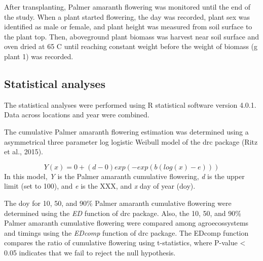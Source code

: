 \documentclass[utf8]{frontiersSCNS}
\begin{document}
After transplanting, Palmer amaranth flowering was monitored until the
end of the study. When a plant started flowering, the day was recorded,
plant sex was identified as male or female, and plant height was
measured from soil surface to the plant top. Then, aboveground plant
biomass was harvest near soil surface and oven dried at 65 C until
reaching constant weight before the weight of biomass (g plant 1) was
recorded.

\hypertarget{statistical-analyses}{%
\subsection*{Statistical analyses}\label{statistical-analyses}}

The statistical analyses were performed using R statistical software
version 4.0.1. Data across locations and year were combined.

The cumulative Palmer amaranth flowering estimation was determined using
a asymmetrical three parameter log logistic Weibull model of the drc
package (Ritz et al., 2015).

\[Y(x) = 0 + (d-0) exp (-exp(b(log(x)-e)))\] In this model, \emph{Y} is
the Palmer amaranth cumulative flowering, \emph{d} is the upper limit
(set to 100), and \emph{e} is the XXX, and \emph{x} day of year (doy).

The doy for 10, 50, and 90\% Palmer amaranth cumulative flowering were
determined using the \emph{ED} function of drc package. Also, the 10,
50, and 90\% Palmer amaranth cumulative flowering were compared among
agroecossystems and timings using the \emph{EDcomp} function of drc
package. The EDcomp function compares the ratio of cumulative flowering
using t-statistics, where P-value \textless{} 0.05 indicates that we
fail to reject the null hypothesis.
\end{document}
